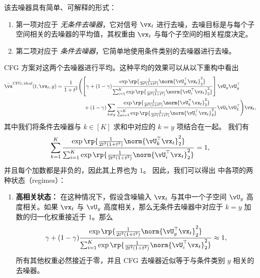 \documentclass[../../book-main_zh.tex]{subfiles}
\begin{document}
\begin{example}
    该去噪器具有简单、可解释的形式：
    \begin{enumerate}
        \item 第一项对应于 \textit{无条件去噪器}，它对信号 $\vx_t$ 进行去噪，去噪目标是与每个子空间相关的去噪器的平均值，其权重由 $\vx_t$ 与每个子空间的相关程度决定。
        \item 第二项对应于 \textit{条件去噪器}，它简单地使用条件类别的去噪器进行去噪。
    \end{enumerate}

    CFG 方案对这两个去噪器进行平均。这种平均的效果可以从以下重构中看出
    \begin{equation}\label{eq:cfg-denoiser-mog-low-rank-2}
        \begin{split}
            \bar{\vx}^{\mathrm{CFG,\,ideal}}(t, \vx_t, y)
            =
            \frac{1}{1 + t^{2}}
            &\Biggl(
                \left[\gamma + (1 - \gamma)
                    \frac{\exp\rp{\frac{1}{2t^{2}(1
                    + t^{2})}\norm{\vU_{y}^{\top}\vx_t}_{2}^{2}}}{\sum_{i
                        = 1}^{K}\exp\rp{\frac{1}{2t^{2}(1
                    + t^{2})}\norm{\vU_{i}^{\top}\vx_t}_{2}^{2}}}
                \right]
                \vU_{y}\vU_{y}^{\top}
                \\
                &\quad+
                (1 - \gamma)
                \sum_{k \neq y}\frac{\exp\rp{\frac{1}{2t^{2}(1
                + t^{2})}\norm{\vU_{k}^{\top}\vx_t}_{2}^{2}}}{\sum_{i
                    = 1}^{K}\exp\rp{\frac{1}{2t^{2}(1
                                +
                t^{2})}\norm{\vU_{i}^{\top}\vx_t}_{2}^{2}}}\vU_{k}\vU_{k}^{\top}
            \Biggr)
            \vx_t,
        \end{split}
    \end{equation}
    其中我们将条件去噪器与 $k \in [K]$ 求和中对应的 $k=y$ 项结合在一起。
    我们有
    \begin{equation}
        \sum_{k=1}^K
        \frac{\exp\rp{\frac{1}{2t^{2}(1
        + t^{2})}\norm{\vU_{k}^{\top}\vx_t}_{2}^{2}}}{\sum_{i
            = 1}^{K}\exp\rp{\frac{1}{2t^{2}(1
        + t^{2})}\norm{\vU_{i}^{\top}\vx_t}_{2}^{2}}}
        = 1,
    \end{equation}
    并且每个加数都是非负的，因此其上界也为 $1$。
    因此，我们可以得出  中各项的两种状态（regimes）：
    \begin{enumerate}
        \item \textbf{高相关状态：} 在这种情况下，假设含噪输入 $\vx_t$ 与其中一个子空间 $\vU_y$ 高度相关。如果 $\vx_t$ 与 $\vU_y$ 高度相关，那么无条件去噪器中对应于 $k=y$ 加数的归一化权重接近于 $1$。那么
            \begin{equation}
                \gamma + (1 - \gamma)
                \frac{\exp\rp{\frac{1}{2t^{2}(1
                + t^{2})}\norm{\vU_{y}^{\top}\vx_t}_{2}^{2}}}{\sum_{i
                    = 1}^{K}\exp\rp{\frac{1}{2t^{2}(1
                + t^{2})}\norm{\vU_{i}^{\top}\vx_t}_{2}^{2}}}
                \approx 1,
            \end{equation}
            所有其他权重必然接近于零，并且 CFG 去噪器近似等于与条件类别 $y$ 相关的去噪器。


\end{enumerate}
\end{example}
\end{document}
